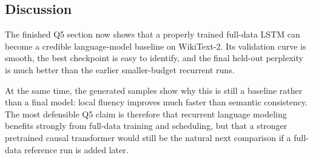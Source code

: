 \subsection{Discussion}

The finished Q5 section now shows that a properly trained full-data LSTM can become a credible language-model baseline on WikiText-2. Its validation curve is smooth, the best checkpoint is easy to identify, and the final held-out perplexity is much better than the earlier smaller-budget recurrent runs.

At the same time, the generated samples show why this is still a baseline rather than a final model: local fluency improves much faster than semantic consistency. The most defensible Q5 claim is therefore that recurrent language modeling benefits strongly from full-data training and scheduling, but that a stronger pretrained causal transformer would still be the natural next comparison if a full-data reference run is added later.